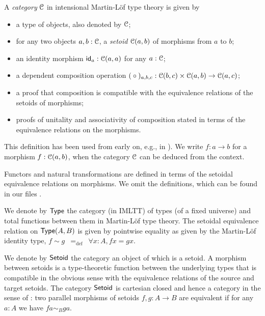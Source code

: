 \documentclass[a4paper,USenglish]{lipics}
\begin{document}
\begin{defn}
 \label{def:cat_imltt}
  A \emph{category} ${\mathcal{C}}$ in intensional Martin-Löf type theory  is given by
  \begin{itemize}
   \item a type of objects, also denoted by ${\mathcal{C}}$;
   \item for any two objects $a,b:{\mathcal{C}}$, a \emph{setoid} ${\mathcal{C}}(a,b)$ of morphisms from $a$ to $b$;
   \item an identity morphism $\mathsf{id}_a : {\mathcal{C}}(a,a)$ for any $a:{\mathcal{C}}$;
   \item a dependent composition operation $({} \circ {})_{a,b,c} : {\mathcal{C}}(b,c) \times {\mathcal{C}}(a,b) \to {\mathcal{C}}(a,c)$;
   \item a proof that composition is compatible with the equivalence relations of the setoids of morphisms;
   \item proofs of unitality and associativity of composition stated in terms of the equivalence relations on the morphisms.
  \end{itemize}
  This definition has been used from early on, e.g., in \parencite{aczel_galois, concat}).
  We write $f:a\to b$ for a morphism $f : {\mathcal{C}}(a,b)$, when the category ${\mathcal{C}}$ can be deduced from the context.
\end{defn}

Functors and natural transformations are defined in terms of the setoidal equivalence relations on morphisms.
We omit the definitions, which can be found in our \coq files \parencite{trimat_coq}.

\begin{defn}
\label{def:set_setoid}
 We denote by $\mathsf{Type}$ the category (in IMLTT) of types (of a fixed universe) and total functions between them in Martin-L\"of type theory. 
 The setoidal equivalence relation on $\mathsf{Type}(A,B)$ is given by pointwise equality as given by the Martin-Löf identity type,
   $f \sim g \enspace =_{\text{def}} \enspace \forall x:A, fx = gx$.
 
 We denote by $\mathsf{Setoid}$ the category an object of which is a setoid.
 A morphism between setoids is a type-theoretic function between the underlying types that is compatible in the obvious sense with the equivalence relations of the source and target setoids.
 The category $\mathsf{Setoid}$ is cartesian closed and hence a category in the sense of : 
 two parallel morphisms of setoids $f,g:A\to B$ are equivalent if for any $a:A$ we have $fa \sim_B ga$.
\end{defn}
\end{document}
